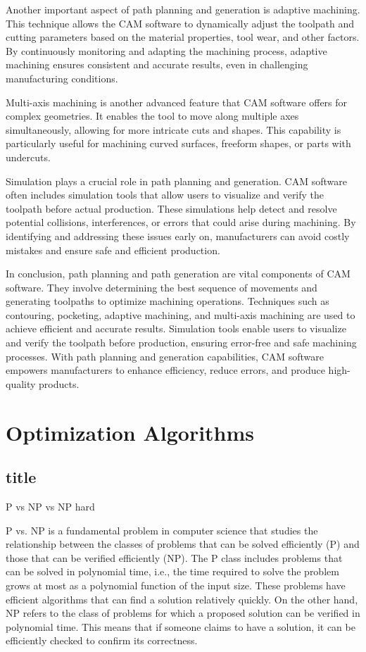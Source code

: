Another important aspect of path planning and generation is adaptive machining. This technique allows the CAM software to dynamically adjust the toolpath and cutting parameters based on the material properties, tool wear, and other factors. By continuously monitoring and adapting the machining process, adaptive machining ensures consistent and accurate results, even in challenging manufacturing conditions.

Multi-axis machining is another advanced feature that CAM software offers for complex geometries. It enables the tool to move along multiple axes simultaneously, allowing for more intricate cuts and shapes. This capability is particularly useful for machining curved surfaces, freeform shapes, or parts with undercuts.

Simulation plays a crucial role in path planning and generation. CAM software often includes simulation tools that allow users to visualize and verify the toolpath before actual production. These simulations help detect and resolve potential collisions, interferences, or errors that could arise during machining. By identifying and addressing these issues early on, manufacturers can avoid costly mistakes and ensure safe and efficient production.

In conclusion, path planning and path generation are vital components of CAM software. They involve determining the best sequence of movements and generating toolpaths to optimize machining operations. Techniques such as contouring, pocketing, adaptive machining, and multi-axis machining are used to achieve efficient and accurate results. Simulation tools enable users to visualize and verify the toolpath before production, ensuring error-free and safe machining processes. With path planning and generation capabilities, CAM software empowers manufacturers to enhance efficiency, reduce errors, and produce high-quality products.
\section{Optimization Algorithms}%

\subsection{title}
P vs NP vs NP hard

P vs. NP is a fundamental problem in computer science that studies the relationship between the classes of problems that can be solved efficiently (P) and those that can be verified efficiently (NP). The P class includes problems that can be solved in polynomial time, i.e., the time required to solve the problem grows at most as a polynomial function of the input size. These problems have efficient algorithms that can find a solution relatively quickly. On the other hand, NP refers to the class of problems for which a proposed solution can be verified in polynomial time. This means that if someone claims to have a solution, it can be efficiently checked to confirm its correctness.

